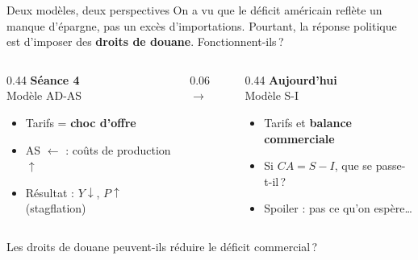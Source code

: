 \documentclass[aspectratio=169]{beamer}
\begin{document}
\begin{frame}[t]{Deux modèles, deux perspectives}
   \small
   \vspace{0.2cm}
   On a vu que le déficit américain reflète un manque d'épargne, pas un excès d'importations. Pourtant, la réponse politique est d'imposer des \textbf{droits de douane}. Fonctionnent-ils\,?
   \vspace{0.3cm}

   \begin{columns}[T]
      \begin{column}{0.44\textwidth}
         \centering
         {\large\textbf{\textcolor{HECgray}{Séance 4}}}\\[2pt]
         \textcolor{HECgray}{Modèle AD-AS}\\[8pt]
         \footnotesize
         \begin{itemize}
            \setlength\itemsep{0.15cm}
            \item Tarifs = \textbf{choc d'offre}
            \item AS $\leftarrow$ : coûts de production $\uparrow$
            \item Résultat : $Y \downarrow$, $P \uparrow$ (stagflation)
         \end{itemize}
      \end{column}
      \begin{column}{0.06\textwidth}
         \centering
         \vspace{0.6cm}
         {\Large\textcolor{HECgray}{$\to$}}
      \end{column}
      \begin{column}{0.44\textwidth}
         \centering
         {\large\textbf{\textcolor{HECnavy}{Aujourd'hui}}}\\[2pt]
         \textcolor{HECnavy}{Modèle S-I}\\[8pt]
         \footnotesize
         \begin{itemize}
            \setlength\itemsep{0.15cm}
            \item Tarifs et \textbf{balance commerciale}
            \item Si $CA = S - I$, que se passe-t-il\,?
            \item Spoiler : pas ce qu'on espère\ldots
         \end{itemize}
      \end{column}
   \end{columns}

   \vspace{0.3cm}
   \begin{keyinsight}[La question]
      \footnotesize
      Les droits de douane peuvent-ils réduire le déficit commercial\,?
   \end{keyinsight}
\end{frame}
\end{document}
